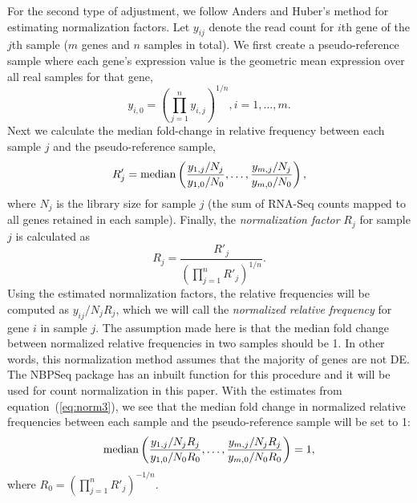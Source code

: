 For the second type of adjustment, we follow Anders and Huber's method
\citep{anders2010differential} for 
estimating normalization factors.  Let $y_{ij}$ denote the read count
for $i$th gene of the $j$th sample ($m$ genes and $n$ samples in total). We first
create a pseudo-reference sample where each gene's expression value is the 
geometric mean expression over all real samples for that gene,
\begin{equation}
y_{i,0} = (\prod_{j=1}^ny_{i,j})^{1/n},  i=1, \ldots, m. 
\end{equation} 
Next we calculate the median fold-change in relative frequency between
each sample $j$ and the pseudo-reference sample,
\begin{equation}\label{eq:normfactors} 
R'_j = \operatorname{median} \left(\dfrac{y_{1,j}/N_j}{y_{1,0}/N_{0}}, \ldots, 
\dfrac{y_{m,j}/N_j}{y_{m,0}/N_{0}}\right),
\end{equation}
where $N_j$ is the library size for sample $j$ (the sum of RNA-Seq
counts mapped to all genes retained in each sample). Finally, the
\textit{normalization factor}  $R_j$ for sample $j$ is calculated as 
\begin{equation}
\label{eq:norm3}
R_j = \dfrac{R'_j}{(\prod_{j=1}^{n}R'_j)^{1/n}}.
\end{equation}
Using the estimated normalization factors, the relative frequencies will be
computed as $y_{ij}/{N_j R_j}$, which we will call the \textit{normalized relative frequency}
for gene $i$ in sample $j$. The assumption made here is that the
median fold change between normalized relative frequencies in two samples should be 1. In
other words, this normalization method assumes that the majority of genes are
not DE. The NBPSeq package \citep{di2014package} has an inbuilt function for
this procedure and it will be used for count normalization in this paper. With
the estimates from equation~(\ref{eq:norm3}), we see that the median fold
change in normalized relative frequencies between each sample and the pseudo-reference
sample will be set to 1:
\begin{equation}
\label{eq:medianfc}
\operatorname{median} \left(\dfrac{y_{1,j}/ N_jR_j}{y_{1,0}/N_{0}R_0}, \ldots,
\dfrac{y_{m,j}/N_j R_j}{y_{m,0}/N_{0}R_0} \right) = 1,
\end{equation}
where $R_0 = (\prod_{j=1}^{n}R'_j)^{-1/n}$.


